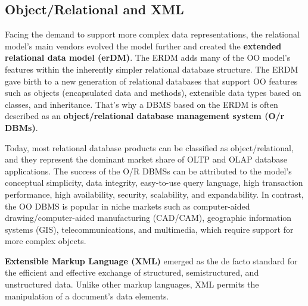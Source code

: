 \documentclass[a4paper, 12pt, titlepage]{report}
\begin{document}
\subsection{Object/Relational and XML}
Facing the demand to support more complex data representations, the relational model’s main vendors evolved the model further and created the \textbf{extended relational data model (erDM)}. The ERDM adds many of the OO model’s features within the inherently simpler relational database structure. The ERDM gave birth to a new generation of relational databases that support OO features such as objects (encapsulated data and methods), extensible data types based on classes, and inheritance. That’s why a DBMS based on the ERDM is often described as an \textbf{object/relational database management system (O/r DBMs)}.

Today, most relational database products can be classified as object/relational, and they represent the dominant market share of OLTP and OLAP database applications. The success of the O/R DBMSs can be attributed to the model’s conceptual simplicity, data integrity, easy-to-use query language, high transaction performance, high availability, security, scalability, and expandability. In contrast, the OO DBMS is popular in niche markets such as computer-aided drawing/computer-aided manufacturing (CAD/CAM), geographic information systems (GIS), telecommunications, and multimedia, which require support for more complex objects.

\textbf{Extensible Markup Language (XML)} emerged as the de facto standard for the efficient and effective exchange of structured, semistructured, and unstructured data. Unlike other markup languages,
XML permits the manipulation of a document’s data elements.
\end{document}

